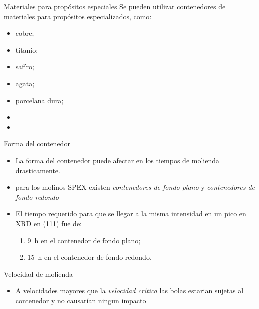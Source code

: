 \documentclass[%
spanish,
progressbar=head,
background=dark,
subsectionpage
]{beamer}
\begin{document}
\begin{frame}{Materiales para propósitos especiales}
    Se pueden utilizar contenedores de materiales para propósitos especializados, como:
    \begin{itemize}
        \item cobre;
        \item titanio;
        \item safíro;
        \item agata;
        \item porcelana dura;
        \item {}
        \item {}
    \end{itemize}
\end{frame}

\begin{frame}{Forma del contenedor}
\begin{itemize}
    \item La forma del contenedor puede afectar en los tiempos de molienda drasticamente.
    \item para los molinos SPEX existen \emph{contenedores de fondo plano} y \emph{contenedores de fondo redondo}
    \item El tiempo requerido para que se llegar a la misma intensidad en un pico en XRD en (111) fue de:
    \begin{enumerate}
        \item \qty{9}{\hour} en el contenedor de fondo plano;
        \item \qty{15}{\hour} en el contenedor de fondo redondo.
    \end{enumerate}
\end{itemize}
\end{frame}

\begin{frame}{Velocidad de molienda}
    \begin{itemize}
        \item A velocidades mayores que la \textit{velocidad crítica} las bolas estarian sujetas al contenedor y no causarían ningun impacto
    \end{itemize} 
\end{frame}
    
\end{document}
